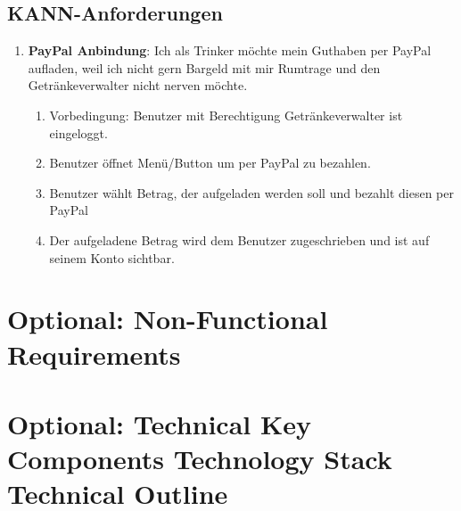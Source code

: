 \documentclass[conference,a4paper]{cs-techrep}
\begin{document}
\subsection{KANN-Anforderungen}

\begin{enumerate}[{USC}1]

\item \textbf{PayPal Anbindung}: Ich als Trinker möchte mein Guthaben per PayPal aufladen, weil ich nicht gern Bargeld mit mir Rumtrage und den Getränkeverwalter nicht nerven möchte.
\begin{enumerate}
	\item Vorbedingung: Benutzer mit Berechtigung Getränkeverwalter ist eingeloggt.
	\item Benutzer öffnet Menü/Button um per PayPal zu bezahlen.
	\item Benutzer wählt Betrag, der aufgeladen werden soll und bezahlt diesen per PayPal
	\item Der aufgeladene Betrag wird dem Benutzer zugeschrieben und ist auf seinem Konto sichtbar.
\end{enumerate}

\end{enumerate}

\section{Optional: Non-Functional Requirements}
\lipsum[3]

\section{Optional: Technical Key Components \textbar{} Technology Stack \textbar{} Technical Outline}
\lipsum[4]


\nocite{ModA-TR-2023SS-WAE-TeamWeiss-Neunerln}
\nocite{ModA-TR-2023SS-BDCC-TeamRot-CompVisPipeline}
\nocite{ModA-TR-2023SS-BDCC-TeamBlau-NauticalNonsense}
\nocite{ModA-TR-2023SS-BCN-TeamGruen-TorpedoTactics}
\nocite{ModA-TR-2023SS-BCN-TeamCyan-Stockbird}
\nocite{ModA-TR-2023SS-BCN-TeamBlau-FancyChess}
\nocite{ModA-TR-2023WS-SWT-TeamRot-SGDb}
\nocite{ModA-TR-2023WS-SWT-TeamGruen-OPCUANetzwerk}
\nocite{ModA-TR-2022SS-WAE-TeamWeiss-WoIstMeinGeld}
\nocite{ModA-TR-2022SS-BDCC-TeamWeiss-TwitterDash}
\nocite{ModA-TR-2022SS-BDCC-TeamRot-Reddiment}
\nocite{ModA-TR-2022SS-BDCC-TeamGruen-ExplosionGuy}
\nocite{ModA-TR-2022SS-BDCC-TeamCyan-OTHWiki}
\nocite{ModA-TR-2022WS-SWT-TeamGruen-Graphvio}
\nocite{ModA-TR-2021SS-WAE-TeamWeiss-CovidDashboard}
\nocite{ModA-TR-2021SS-WAE-TeamRot-FireForceDefense}
\nocite{ModA-TR-2021SS-WAE-TeamGruen-MedPlanner}

\sloppy
\printbibliography[notcategory=selfref]
\end{document}

